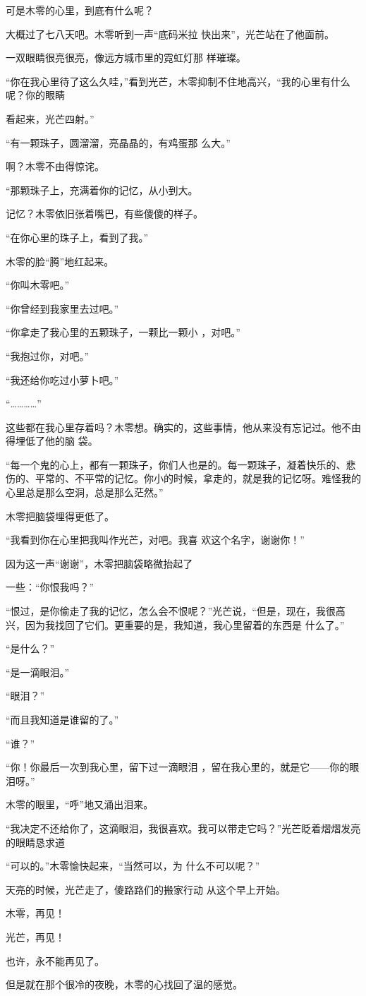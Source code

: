 \documentclass{article}
\begin{document}
可是木零的心里，到底有什么呢？ 

大概过了七八天吧。木零听到一声“底码米拉
快出来”，光芒站在了他面前。 

一双眼睛很亮很亮，像远方城市里的霓虹灯那
样璀璨。 

“你在我心里待了这么久哇，”看到光芒，木零抑制不住地高兴，“我的心里有什么呢？你的眼睛

\newpage
看起来，光芒四射。” 

“有一颗珠子，圆溜溜，亮晶晶的，有鸡蛋那
么大。” 


啊？木零不由得惊诧。 

“那颗珠子上，充满着你的记忆，从小到大。

记忆？木零依旧张着嘴巴，有些傻傻的样子。


“在你心里的珠子上，看到了我。” 


木零的脸“腾”地红起来。 


“你叫木零吧。” 


“你曾经到我家里去过吧。” 

“你拿走了我心里的五颗珠子，一颗比一颗小
，对吧。” 

\newpage


“我抱过你，对吧。” 


“我还给你吃过小萝卜吧。” 


“…………” 

这些都在我心里存着吗？木零想。确实的，这些事情，他从来没有忘记过。他不由得埋低了他的脑
袋。 

“每一个鬼的心上，都有一颗珠子，你们人也是的。每一颗珠子，凝着快乐的、悲伤的、平常的、不平常的记忆。你小的时候，拿走的，就是我的记忆呀。难怪我的心里总是那么空洞，总是那么茫然。”


木零把脑袋埋得更低了。 

“我看到你在心里把我叫作光芒，对吧。我喜
欢这个名字，谢谢你！” 

因为这一声“谢谢”，木零把脑袋略微抬起了
\newpage

一些：“你恨我吗？” 

“恨过，是你偷走了我的记忆，怎么会不恨呢？”光芒说，“但是，现在，我很高兴，因为我找回了它们。更重要的是，我知道，我心里留着的东西是
什么了。” 


“是什么？” 


“是一滴眼泪。” 


“眼泪？” 


“而且我知道是谁留的了。” 


“谁？” 

“你！你最后一次到我心里，留下过一滴眼泪
，留在我心里的，就是它——你的眼泪呀。” 


\newpage

木零的眼里，“呼”地又涌出泪来。 

“我决定不还给你了，这滴眼泪，我很喜欢。我可以带走它吗？”光芒眨着熠熠发亮的眼睛恳求道

“可以的。”木零愉快起来，“当然可以，为
什么不可以呢？” 

天亮的时候，光芒走了，傻路路们的搬家行动
从这个早上开始。 


木零，再见！ 


光芒，再见！ 


也许，永不能再见了。 

但是就在那个很冷的夜晚，木零的心找回了温的感觉。
\end{document}
